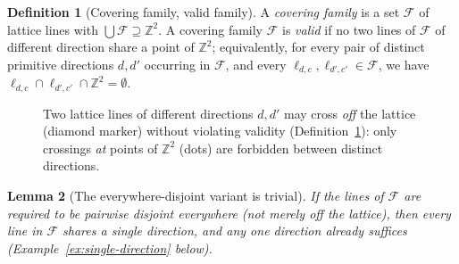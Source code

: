 \documentclass[a4paper,11pt,oneside,reqno]{amsart}
\theoremstyle{definition}
\newtheorem{definition}{Definition}
\theoremstyle{remark}
\theoremstyle{plain}
\newtheorem{lemma}[definition]{Lemma}
\newcommand{\Z}{\mathbb{Z}}
\begin{document}
\begin{definition}[Covering family, valid family]
  \label{def:family}
  A \emph{covering family} is a set \(\mathcal F\) of lattice lines with \(\bigcup\mathcal F\supseteq\Z^2\). A
  covering family \(\mathcal F\) is \emph{valid} if no two lines of \(\mathcal F\) of different
  direction share a point of \(\Z^2\); equivalently, for every pair of distinct primitive directions
  \(d,d'\) occurring in \(\mathcal F\), and every \(\ell_{d,c},\ell_{d',c'}\in\mathcal F\), we have
  \(\ell_{d,c}\cap\ell_{d',c'}\cap\Z^2=\emptyset\).
\end{definition}

\begin{figure}[h]
  \centering
  \caption{Two lattice lines of different directions \(d,d'\) may cross \emph{off} the lattice
  (diamond marker) without violating validity (Definition~\ref{def:family}): only crossings
  \emph{at} points of \(\Z^2\) (dots) are forbidden between distinct directions.}
  \label{fig:offlattice-crossing}
\end{figure}

\begin{lemma}[The everywhere-disjoint variant is trivial]
  \label{lem:everywhere-disjoint-trivial}
  If the lines of \(\mathcal F\) are required to be pairwise disjoint everywhere (not merely off the
  lattice), then every line in \(\mathcal F\) shares a single direction, and any one direction
  already suffices (Example~\ref{ex:single-direction} below).
\end{lemma}
\end{document}
